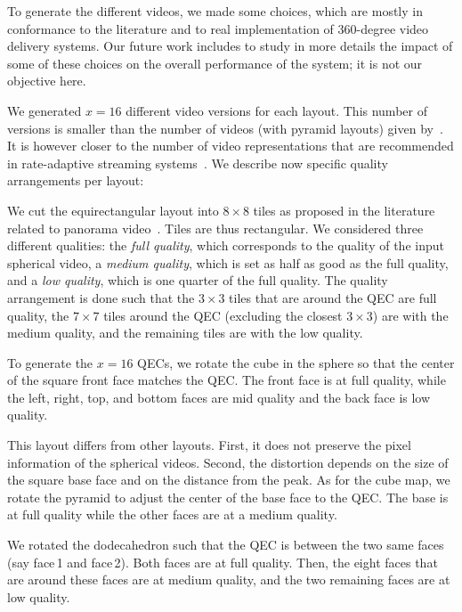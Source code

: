 

To generate the different videos, we made some choices, which are mostly in conformance to the
literature and to real implementation of 360-degree video delivery systems. Our future work 
includes to study in more details the impact of some of these choices on
the overall performance of the system; it is not our objective here.

We generated $x=16$ different video versions for each layout. This number of versions is smaller than
the number of videos (with pyramid layouts) given by~\citet{facebook}. It is however closer to the
number of video representations that are recommended in rate-adaptive streaming 
systems~\cite{Aparicio-PardoP15}. We describe now specific quality arrangements per layout:

We cut the equirectangular layout into $8\times 8$ tiles as proposed in
the literature related to panorama video~\cite{gaddam_tiling_2015}. Tiles are thus rectangular.
We considered three different qualities: the \emph{full quality}, which corresponds to the quality of the
input spherical video, a \emph{medium quality}, which is set as half as good as the full quality, and a 
\emph{low quality}, which is one quarter of the full quality. The quality arrangement is done such that
the $3\times 3$ tiles that are around the \ac{QEC} are full quality, the $7\times 7$ tiles around 
the \ac{QEC} (excluding the closest $3\times 3$) are with the medium quality, and the remaining tiles
are with the low quality.

To generate the $x=16$ \acp{QEC}, we rotate the cube in the sphere so that the
center of the square front face matches the \ac{QEC}. The front face is at full quality, while the left, right, 
top, and bottom faces are mid quality and the back face is low quality.

This layout differs from other layouts. First, it does not preserve
the pixel information of the spherical videos. Second, the distortion depends on the size of the square
base face and on the distance from the peak. As for the cube map, we rotate the pyramid to adjust
the center of the base face to the \ac{QEC}. The base is at full quality while the other faces are
at a medium quality. 

We rotated the dodecahedron such that the \ac{QEC} is between
the two same faces (say face\,1 and face\,2). Both faces are at full quality. Then, the eight 
faces that are around
these faces are at medium quality, and the two remaining faces are at low quality.


